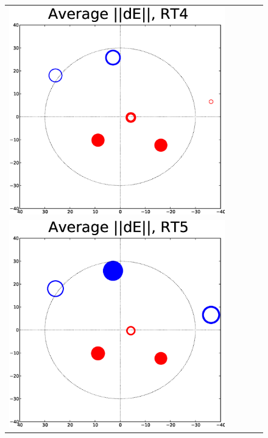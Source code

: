 \documentclass[]{aa}
\begin{document}
\begin{figure}
\begin{tabular}{@{}c@{}c@{}c@{}c@{}c@{}}
\includegraphics[width=\roguewidth]{o2003_dE_ant4} \\
\includegraphics[width=\roguewidth]{o2003_dE_ant5} &

\end{tabular}
\end{figure}
\end{document}
